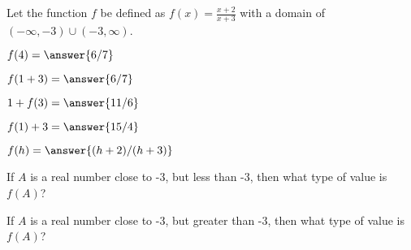 \documentclass{ximera}
\begin{document}
\begin{definition}
Let the function $f$ be defined as $f(x) = \frac{x+2}{x+3}$ with a domain of $(-\infty, -3) \cup (-3, \infty)$. 

\end{definition}




\begin{exercise}
$f(4) = \answer{6/7} $ 
\end{exercise}




\begin{exercise}
$f(1+3) = \answer{6/7} $ 
\end{exercise}



\begin{exercise}
$1+ f(3) = \answer{11/6} $ 
\end{exercise}



\begin{exercise}
$f(1)+3 = \answer{15/4} $ 
\end{exercise}



\begin{exercise}
$f(h) = \answer{(h+2)/(h+3)} $ 
\end{exercise}



\begin{exercise}
If $A$ is a real number close to -3, but less than -3, then what type of value is $f(A)$?

\begin{multipleChoice}
\end{multipleChoice}

\end{exercise}



\begin{exercise}
If $A$ is a real number close to -3, but greater than -3, then what type of value is $f(A)$?

\begin{multipleChoice}
\end{multipleChoice}

\end{exercise}
\end{document}
